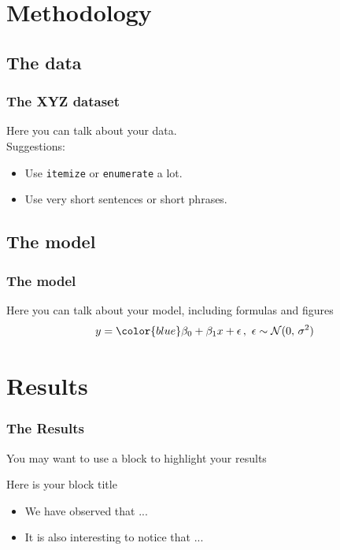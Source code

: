 \documentclass[11pt]{beamer}
\begin{document}
\section{Methodology}   %

\subsection{The data}   %

\begin{frame}          %
\frametitle{The XYZ dataset}
Here you can talk about your data. \\
\bigskip
Suggestions:
\begin{itemize}
\setlength\itemsep{2em}	
\item Use \texttt{itemize} or \texttt{enumerate} a lot.
\item Use very short sentences or short phrases.
\end{itemize}
\end{frame}

\subsection{The model}    %

\begin{frame}          %
\frametitle{The model}
Here you can talk about your model, including formulas and figures
\bigskip
\begin{equation}          
y = {\color{blue}\beta_0} + \beta_1x + \epsilon\,,\,\,
\epsilon \sim \mathcal{N}(0,\,\sigma^{2})
\end{equation}
\end{frame}

\section{Results}   %

\begin{frame}          %
\frametitle{The Results}
You may want to use a block to highlight your results 
\bigskip
\begin{block}{Here is your block title}
	\begin{itemize}
	\setlength\itemsep{1.5em}	
	\item<1-> We have observed that ...
	\item<2-> It is also interesting to notice that ...  
	\end{itemize}
\end{block}
\end{frame}
\end{document}
